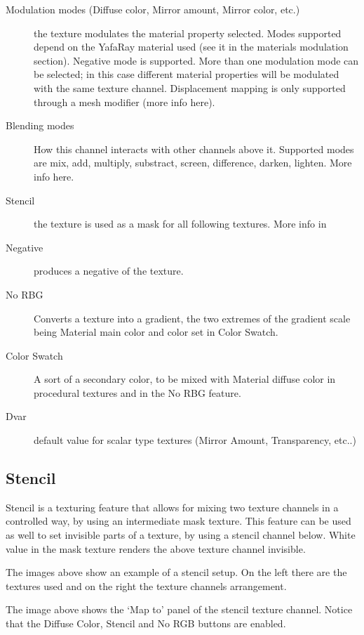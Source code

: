 \begin{description}
\item[Modulation modes (Diffuse color, Mirror amount, Mirror color, etc.)] the texture modulates the material property selected. Modes supported depend on the YafaRay material used (see it in the materials modulation section). Negative mode is supported. More than one modulation mode can be selected; in this case different material properties will be modulated with the same texture channel. Displacement mapping is only supported through a mesh modifier (more info here).
\item[Blending modes] How this channel interacts with other channels above it. Supported modes are mix, add, multiply, substract, screen, difference, darken, lighten. More info here.
\item[Stencil] the texture is used as a mask for all following textures. More info in 
\item[Negative] produces a negative of the texture.
\item[No RBG] Converts a texture into a gradient, the two extremes of the gradient scale being Material main color and color set in Color Swatch.
\item[Color Swatch] A sort of a secondary color, to be mixed with Material diffuse color in procedural textures and in the No RBG feature.
\item[Dvar] default value for scalar type textures (Mirror Amount, Transparency, etc..)
\end{description}

\subsection{Stencil} \label{sec:stencil}

Stencil is a texturing feature that allows for mixing two texture channels in a controlled way, by using an intermediate mask texture. This feature can be used as well to set invisible parts of a texture, by using a stencil channel below. White value in the mask texture renders the above texture channel invisible.

The images above show an example of a stencil setup. On the left there are the textures used and on the right the texture channels arrangement.

The image above shows the `Map to' panel of the stencil texture channel. Notice that the Diffuse Color, Stencil and No RGB buttons are enabled.

